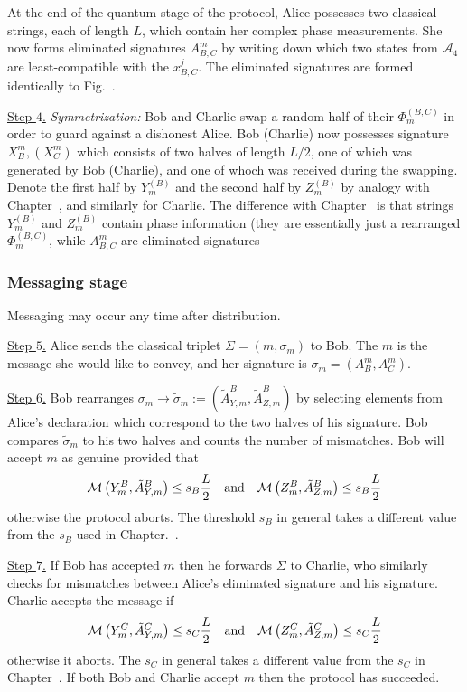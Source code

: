 At the end of the quantum stage of the protocol, Alice possesses two classical strings, each of length $L$, which contain her complex phase measurements. She now forms eliminated signatures $A_{B, C}^m$ by writing down which two states from $\mathcal{A}_4$ are least-compatible with the $x_{B, C}^j$. The eliminated signatures are formed identically to Fig.~.

\noindent \underline{Step $4$.} \emph{Symmetrization:} Bob and Charlie swap a random half of their $\Phi_m^{\left(B, C\right)}$ in order to guard against a dishonest Alice. Bob (Charlie) now possesses signature $X_B^m, \left(X_C^m\right)$ which consists of two halves of length $L/2$, one of which was generated by Bob (Charlie), and one of whoch was received during the swapping. Denote the first half by $Y_m^{\left(B\right)}$ and the second half by $Z_m^{\left(B\right)}$ by analogy with Chapter~, and similarly for Charlie. The difference with Chapter~ is that strings$Y_m^{\left(B\right)}$ and $Z_m^{\left(B\right)}$ contain phase information (they are essentially just a rearranged $\Phi_m^{\left(B, C\right)}$, while $A_{B, C}^m$ are eliminated signatures

\subsubsection{Messaging stage}
Messaging may occur any time after distribution.

\noindent \underline{Step $5$.} Alice sends the classical triplet $\Sigma = \left(m, \sigma_m\right)$ to Bob. The $m$ is the message she would like to convey, and her signature is $\sigma_m = \left(A_B^m, A_C^m\right)$. 

\noindent \underline{Step $6$.} Bob rearranges $\sigma_m \rightarrow \tilde{\sigma}_m := \left(\tilde{A}_{Y, m}^B, \tilde{A}_{Z, m}^B\right)$ by selecting elements from Alice's declaration which correspond to the two halves of his signature. Bob compares $\tilde{\sigma}_m$ to his two halves and counts the number of mismatches. Bob will accept $m$ as genuine provided that
\begin{equation}
\mathcal{M}\left(Y_m^B, \tilde{A}_{Y, m}^B\right) \le s_B \frac{L}{2} \qq{and} \mathcal{M}\left(Z_m^B, \tilde{A}_{Z, m}^B\right) \le s_B \frac{L}{2}
\end{equation}
otherwise the protocol aborts. The threshold $s_B$ in general takes a different value from the $s_B$ used in Chapter.~.

\noindent \underline{Step $7$.} If Bob has accepted $m$ then he forwards $\Sigma$ to Charlie, who similarly checks for mismatches between Alice's eliminated signature and his signature. Charlie accepts the message if
\begin{equation}
\mathcal{M}\left(Y_m^C, \tilde{A}_{Y, m}^C\right) \le s_C \frac{L}{2} \qq{and} \mathcal{M}\left(Z_m^C, \tilde{A}_{Z, m}^C\right) \le s_C \frac{L}{2}
\end{equation}
otherwise it aborts. The $s_C$ in general takes a different value from the $s_C$ in Chapter~. If both Bob and Charlie accept $m$ then the protocol has succeeded. 

